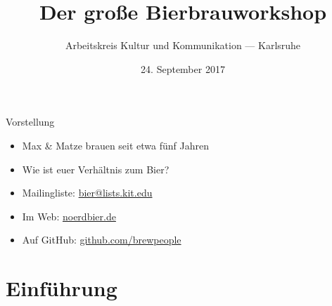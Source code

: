 \documentclass[9pt, ngerman]{beamer}
\title{Der große Bierbrauworkshop}
\author{Arbeitskreis Kultur und Kommunikation --- Karlsruhe}
\date{24. September 2017}
\begin{document}
\maketitle


\begin{frame}{Vorstellung}
  \begin{itemize}
    \item Max \& Matze brauen seit etwa fünf Jahren
    \item Wie ist euer Verhältnis zum Bier?
  \end{itemize}

  \begin{itemize}
    \item Mailingliste: \href{mailto:bier@lists.kit.edu}{bier@lists.kit.edu}
    \item Im Web: \href{http://noerdbier.de}{noerdbier.de}
    \item Auf GitHub: \href{https://gtihub.com/brewpeople}{github.com/brewpeople}
  \end{itemize}
\end{frame}

\section{Einführung}
\end{document}
